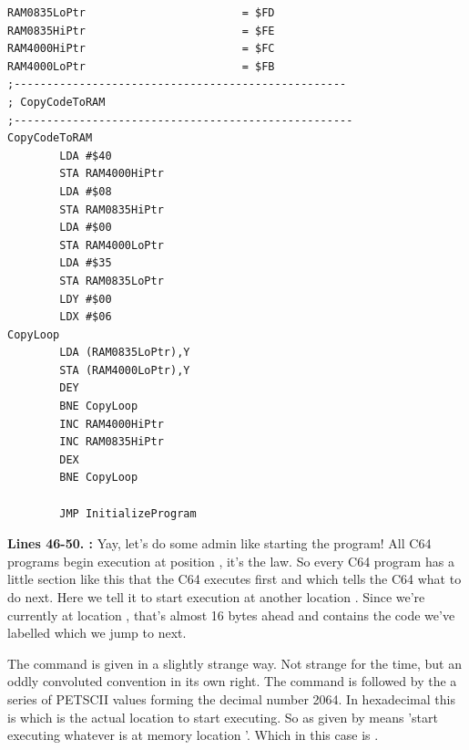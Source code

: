 \bigskip
\bigskip
\bigskip
\bigskip
\bigskip
\bigskip
\bigskip
\begin{lstlisting}[caption=Some strictly unnecessary code copying]
RAM0835LoPtr                        = $FD
RAM0835HiPtr                        = $FE
RAM4000HiPtr                        = $FC
RAM4000LoPtr                        = $FB
;---------------------------------------------------
; CopyCodeToRAM
;----------------------------------------------------
CopyCodeToRAM
        LDA #$40
        STA RAM4000HiPtr
        LDA #$08
        STA RAM0835HiPtr
        LDA #$00
        STA RAM4000LoPtr
        LDA #$35
        STA RAM0835LoPtr
        LDY #$00                                 
        LDX #$06
CopyLoop   
        LDA (RAM0835LoPtr),Y
        STA (RAM4000LoPtr),Y
        DEY 
        BNE CopyLoop
        INC RAM4000HiPtr
        INC RAM0835HiPtr
        DEX 
        BNE CopyLoop

        JMP InitializeProgram

\end{lstlisting}
\clearpage
{}
\textbf{Lines 46-50. :} Yay, let's do some admin like starting the program! All C64 programs 
begin execution at position , it's the law.
So every C64 program has a little section like this that the C64 executes first and which tells the C64 what to do next.
Here we tell it to start execution at another location . Since we're currently at location , that's
almost 16 bytes ahead and contains the code we've labelled  which we jump to next.

The command is given in a slightly strange way. Not strange for the time, but an oddly convoluted convention in its own right.
The  command is followed by the a series of PETSCII values forming the decimal number 2064. In hexadecimal this is
 which is the actual location to start executing. So  as given by 
means 'start executing whatever is at memory location '. Which in this case is .

